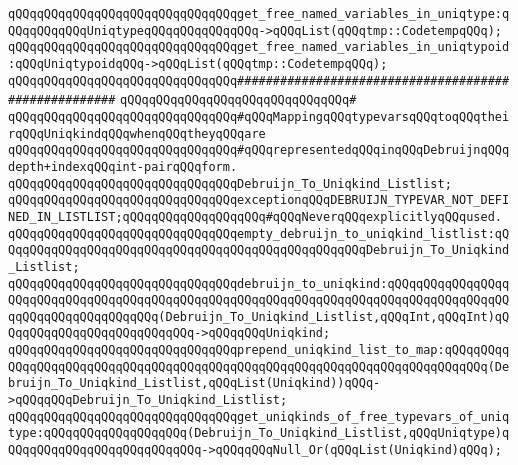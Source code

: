 \newline
\verb|qQQqqQQqqQQqqQQqqQQqqQQqqQQqqQQqget_free_named_variables_in_uniqtype:qQQqqQQqqQQqUniqtypeqQQqqQQqqQQqqQQq->qQQqList(qQQqtmp::CodetempqQQq);|\newline
\verb|qQQqqQQqqQQqqQQqqQQqqQQqqQQqqQQqget_free_named_variables_in_uniqtypoid:qQQqUniqtypoidqQQq->qQQqList(qQQqtmp::CodetempqQQq);|\newline
\newline
\newline
\newline
\newline
\newline
\verb|qQQqqQQqqQQqqQQqqQQqqQQqqQQqqQQq#####################################################|\newline
\verb|qQQqqQQqqQQqqQQqqQQqqQQqqQQqqQQq#|\newline
\verb|qQQqqQQqqQQqqQQqqQQqqQQqqQQqqQQq#qQQqMappingqQQqtypevarsqQQqtoqQQqtheirqQQqUniqkindqQQqwhenqQQqtheyqQQqare|\newline
\verb|qQQqqQQqqQQqqQQqqQQqqQQqqQQqqQQq#qQQqrepresentedqQQqinqQQqDebruijnqQQqdepth+indexqQQqint-pairqQQqform.|\newline
\newline
\verb|qQQqqQQqqQQqqQQqqQQqqQQqqQQqqQQqDebruijn_To_Uniqkind_Listlist;|\newline
\newline
\verb|qQQqqQQqqQQqqQQqqQQqqQQqqQQqqQQqexceptionqQQqDEBRUIJN_TYPEVAR_NOT_DEFINED_IN_LISTLIST;qQQqqQQqqQQqqQQqqQQq#qQQqNeverqQQqexplicitlyqQQqused.|\newline
\newline
\verb|qQQqqQQqqQQqqQQqqQQqqQQqqQQqqQQqempty_debruijn_to_uniqkind_listlist:qQQqqQQqqQQqqQQqqQQqqQQqqQQqqQQqqQQqqQQqqQQqqQQqqQQqDebruijn_To_Uniqkind_Listlist;|\newline
\newline
\verb|qQQqqQQqqQQqqQQqqQQqqQQqqQQqqQQqdebruijn_to_uniqkind:qQQqqQQqqQQqqQQqqQQqqQQqqQQqqQQqqQQqqQQqqQQqqQQqqQQqqQQqqQQqqQQqqQQqqQQqqQQqqQQqqQQqqQQqqQQqqQQqqQQqqQQqqQQq(Debruijn_To_Uniqkind_Listlist,qQQqInt,qQQqInt)qQQqqQQqqQQqqQQqqQQqqQQqqQQq->qQQqqQQqUniqkind;|\newline
\verb|qQQqqQQqqQQqqQQqqQQqqQQqqQQqqQQqprepend_uniqkind_list_to_map:qQQqqQQqqQQqqQQqqQQqqQQqqQQqqQQqqQQqqQQqqQQqqQQqqQQqqQQqqQQqqQQqqQQqqQQqqQQq(Debruijn_To_Uniqkind_Listlist,qQQqList(Uniqkind))qQQq->qQQqqQQqDebruijn_To_Uniqkind_Listlist;|\newline
\verb|qQQqqQQqqQQqqQQqqQQqqQQqqQQqqQQqget_uniqkinds_of_free_typevars_of_uniqtype:qQQqqQQqqQQqqQQqqQQq(Debruijn_To_Uniqkind_Listlist,qQQqUniqtype)qQQqqQQqqQQqqQQqqQQqqQQqqQQq->qQQqqQQqNull_Or(qQQqList(Uniqkind)qQQq);|\newline
